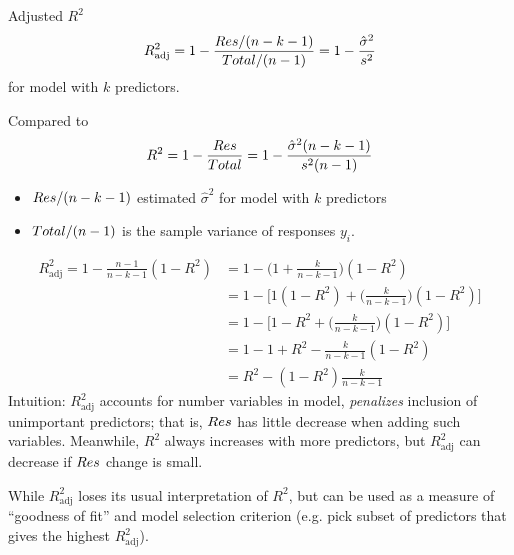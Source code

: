 \begin{Definition}{Adjusted $ R^2 $}{}
    \[ R^2_{\text{adj}}=1-\frac{\relax{Res}/(n-k-1)}{
            \relax{Total}/(n-1)
        }=1-\frac{\hat{\sigma}^2}{s^2}  \]
    for model with $ k $ predictors.
\end{Definition}
Compared to
\[ R^2=1-\frac{\relax{Res}}{\relax{Total}}=1-\frac{\hat{\sigma}^2(n-k-1)}{s^2(n-1)}   \]
\begin{itemize}
    \item $ \relax{Res}/(n-k-1) $
          estimated $ \hat{\sigma}^2 $
          for model with $ k $ predictors
    \item $ \relax{Total}/(n-1) $ is the sample variance
          of responses $ y_i $.
\end{itemize}
\begin{align*}
    R^2_{\text{adj}}=1-\frac{n-1}{n-k-1}(1-R^2)
     & = 1-\biggl( 1+\frac{k}{n-k-1} \biggr)
    (1-R^2)                                                               \\
     & =1-\biggl[ 1(1-R^2)+\biggl( \frac{k}{n-k-1} \biggr)(1-R^2) \biggr] \\
     & =1-\biggl[ 1-R^2+\biggl( \frac{k}{n-k-1}  \biggr)(1-R^2) \biggr]   \\
     & =1-1+R^2-\frac{k}{n-k-1} (1-R^2)                                   \\
     & =R^2-(1-R^2)\frac{k}{n-k-1}
\end{align*}
Intuition: $ R^2_{\text{adj}} $
accounts for number variables in model,
\emph{penalizes} inclusion of unimportant
predictors; that is, $ \relax{Res} $
has little decrease when adding
such variables. Meanwhile, $ R^2 $
always increases with more predictors,
but $ R^2_{\text{adj}} $ can decrease
if $ \relax{Res} $ change is small.

While $ R^2_{\text{adj}} $ loses its usual
interpretation of $ R^2 $, but can be used
as a measure of ``goodness of fit''
and model selection criterion (e.g.
pick subset of predictors that gives the highest
$ R^2_{\text{adj}} $).



